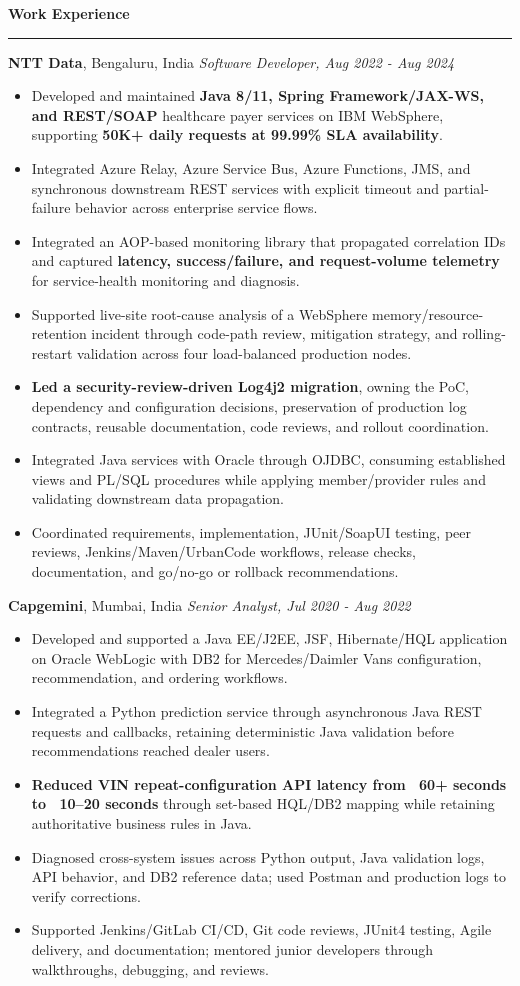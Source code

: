 \documentclass[11pt,letterpaper]{article}
\newcommand{\ressection}[1]{\Needspace{6\baselineskip}\vspace{8pt}\par\textbf{#1}\par\vspace{2pt}\hrule\vspace{5pt}}
\begin{document}
\ressection{Work Experience}
\textbf{NTT Data}, Bengaluru, India \hfill \textit{Software Developer, Aug 2022 - Aug 2024}
\begin{itemize}
  \item Developed and maintained \textbf{Java 8/11, Spring Framework/JAX-WS, and REST/SOAP} healthcare payer services on IBM WebSphere, supporting \textbf{50K+ daily requests at 99.99\% SLA availability}.
  \item Integrated Azure Relay, Azure Service Bus, Azure Functions, JMS, and synchronous downstream REST services with explicit timeout and partial-failure behavior across enterprise service flows.
  \item Integrated an AOP-based monitoring library that propagated correlation IDs and captured \textbf{latency, success/failure, and request-volume telemetry} for service-health monitoring and diagnosis.
  \item Supported live-site root-cause analysis of a WebSphere memory/resource-retention incident through code-path review, mitigation strategy, and rolling-restart validation across four load-balanced production nodes.
  \item \textbf{Led a security-review-driven Log4j2 migration}, owning the PoC, dependency and configuration decisions, preservation of production log contracts, reusable documentation, code reviews, and rollout coordination.
  \item Integrated Java services with Oracle through OJDBC, consuming established views and PL/SQL procedures while applying member/provider rules and validating downstream data propagation.
  \item Coordinated requirements, implementation, JUnit/SoapUI testing, peer reviews, Jenkins/Maven/UrbanCode workflows, release checks, documentation, and go/no-go or rollback recommendations.
\end{itemize}
\textbf{Capgemini}, Mumbai, India \hfill \textit{Senior Analyst, Jul 2020 - Aug 2022}
\begin{itemize}
  \item Developed and supported a Java EE/J2EE, JSF, Hibernate/HQL application on Oracle WebLogic with DB2 for Mercedes/Daimler Vans configuration, recommendation, and ordering workflows.
  \item Integrated a Python prediction service through asynchronous Java REST requests and callbacks, retaining deterministic Java validation before recommendations reached dealer users.
  \item \textbf{Reduced VIN repeat-configuration API latency from ~60+ seconds to ~10--20 seconds} through set-based HQL/DB2 mapping while retaining authoritative business rules in Java.
  \item Diagnosed cross-system issues across Python output, Java validation logs, API behavior, and DB2 reference data; used Postman and production logs to verify corrections.
  \item Supported Jenkins/GitLab CI/CD, Git code reviews, JUnit4 testing, Agile delivery, and documentation; mentored junior developers through walkthroughs, debugging, and reviews.
\end{itemize}
\end{document}
